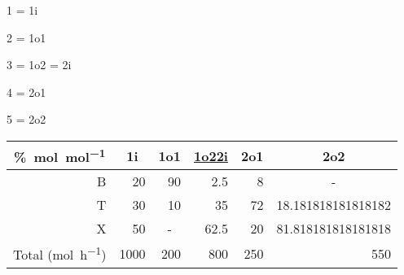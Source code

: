 \documentclass[12pt]{article}
\begin{document}
\begin{center}

\begin{itemize}
\begin{multicols}{4}

	\item 1 = 1i
	\item 2 = 1o1
	\item 3 = 1o2 = 2i
	\item 4 = 2o1
	\item 5 = 2o2

\end{multicols}
\end{itemize}

\vspace{5mm}

\begin{tabular}{r *{5}{r} }

	\multicolumn{1}{c}{\unit{\percent.\mole\per\mole}}
	& \multicolumn{1}{c}{1i}
	& \multicolumn{1}{c}{1o1}
	& \multicolumn{1}{c}{\underline{1o2\quad 2i}}
	& \multicolumn{1}{c}{2o1}
	& \multicolumn{1}{c}{2o2}
	
	\\ \midrule
	
	B
	& 20
	& 90
	& 2.5
	& 8
	& \multicolumn{1}{c}{-}
	
	\\
	
	T
	& 30
	& 10
	& 35
	& 72
	& \num{18.181818181818182}
	
	\\
	
	X
	& 50
	& \multicolumn{1}{c}{-}
	& 62.5
	& 20
	& \num{81.818181818181818}
	
	\\ \midrule
	
	Total (\unit{\mole\per\hour})
	& 1000
	& 200
	& 800
	& 250
	& 550

\end{tabular}

\end{center}

\vspace{5mm}
\end{document}
